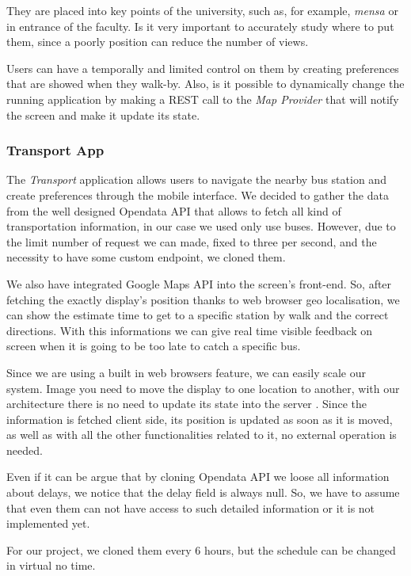 \documentclass[]{usiinfbachelorproject}
\begin{document}
They are placed into key points of the university, such as, for example, \emph{mensa} or in entrance of the faculty. Is it very important to accurately study where to put them, since a poorly position can reduce the number of views.

Users can have a temporally and limited control on them by creating preferences that are showed when they walk-by.
Also, is it possible to dynamically change the running application by making a REST call to the \emph{Map Provider} that will notify the screen and make it update its state.


\subsubsection{Transport App}
The \emph{Transport} application allows users to navigate the nearby bus station and create preferences through the mobile interface. We decided to gather the data from the well designed Opendata API that allows to fetch all kind of transportation information, in our case we used only use buses.
However, due to the limit number of request we can made, fixed to three per second, and the necessity to have some custom endpoint, we cloned them.

We also have integrated Google Maps API into the screen's front-end. So, after fetching the exactly display's position thanks to web browser geo localisation, we can show the estimate time to get to a specific station by walk and the correct directions. With this informations we can give real time visible feedback on screen when it is going to be too late to catch a specific bus.

Since we are using a built in web browsers feature, we can easily scale our system. Image you need to move the display to one location to another, with our architecture there is no need to update its state into the server . Since the information is fetched client side, its position is updated as soon as it is moved, as well as with all the other functionalities related to it,  no external operation is needed.

Even if it can be argue that by cloning Opendata API we loose all information about delays, we notice that the delay field is always null. So, we have to assume that even them can not have access to such detailed information or it is not implemented yet.

For our project, we cloned them every 6 hours, but the schedule can be changed in virtual no time.

\end{document}
